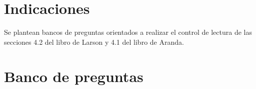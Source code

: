 \documentclass[a4,11pt]{aleph-notas}
\begin{document}
\encabezado

\vspace*{-8mm}
\tableofcontents

\section{Indicaciones}

Se plantean bancos de preguntas orientados a realizar el control de lectura de las secciones 4.2 del libro de Larson y 4.1 del libro de Aranda.

\section{Banco de preguntas}
\end{document}
